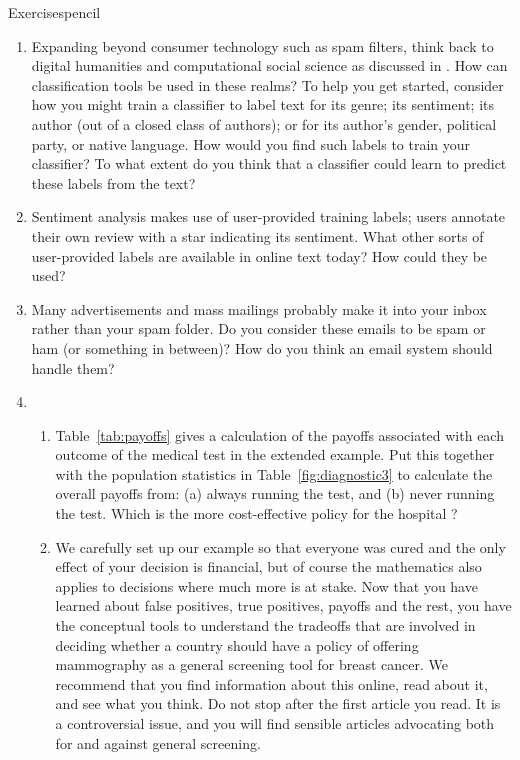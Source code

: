 \begin{tblsfilledsymbol}{Exercises}{pencil}
    


\begin{enumerate}

\item  Expanding beyond consumer technology such as spam filters, think back to digital humanities and computational social science as discussed in .  How can classification tools be used in these realms?  To help you get started, consider how you might train a classifier to label text for its genre; its sentiment; its author (out of a closed class of authors); or for its author's gender, political party, or native language.  How would you find such labels to train your classifier?  To what extent do you think that a classifier could learn to predict these labels from the text?


\item  Sentiment analysis makes use of user-provided training labels; users annotate their own review with a star indicating its sentiment.  What other sorts of user-provided labels are available in online text today? How could they be used?



\item  Many advertisements and mass mailings probably make it into your inbox rather than your spam folder.  Do you consider these emails to be spam or ham (or something in between)?   How do you think an email system should handle them?


\item 
  \begin{enumerate}
\item Table~\ref{tab:payoffs} gives a calculation of the payoffs associated with each outcome of the medical test in the extended example. Put this together with the population statistics in Table~\ref{fig:diagnostic3}
to calculate the overall payoffs from: (a) always running the test, and (b) never running the test. Which is the more cost-effective policy for the hospital ? 
\item We carefully set up our example so that everyone was cured and the only effect of your decision is financial, but of course the mathematics also applies to decisions where much more is at stake. 
Now that you have learned about false positives, true positives, payoffs and the rest, you have the conceptual tools to understand the tradeoffs that are involved in deciding whether a country should
have a policy of offering mammography as a general screening tool for breast cancer. We recommend that you find information about this online, read about it, and see what you think. Do not
stop after the first article you read. It is a controversial issue, and you will find sensible articles advocating both for and against general screening. 
\end{enumerate}


\end{enumerate}
\end{tblsfilledsymbol}
